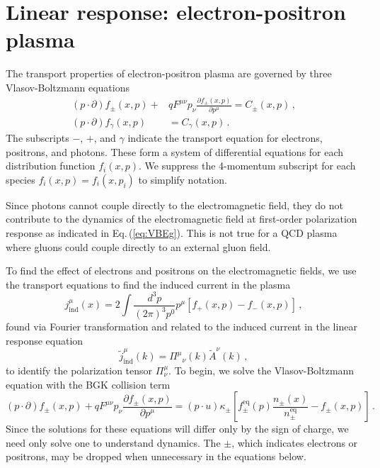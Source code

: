 \section{Linear response: electron-positron plasma}
The transport properties of electron-positron plasma are governed by three Vlasov-Boltzmann equations \cite{Grayson:2023flr}
\begin{align}\label{eq:VBEf}
(p \cdot \partial) f_\pm(x,p) + &q F^{\mu\nu} p_\nu \frac{\partial f_\pm(x,p)}{\partial p^\mu} = C_\pm(x,p)\,,\\
\label{eq:VBEg}(p \cdot \partial) f_\gamma(x,p) &= C_\gamma(x,p)\,.
\end{align}
The subscripts $-$, $+$, and $\gamma$ indicate the transport equation for electrons, positrons, and photons. These form a system of differential equations for each distribution function $f_i(x,p)$. We suppress the 4-momentum subscript for each species $f_i(x,p) = f_i(x,p_i)$ to simplify notation. 

Since photons cannot couple directly to the electromagnetic field, they do not contribute to the dynamics of the electromagnetic field at first-order polarization response as indicated in Eq.\,(\ref{eq:VBEg}). This is not true for a QCD plasma where gluons could couple directly to an external gluon field.

To find the effect of electrons and positrons on the electromagnetic fields, we use the transport equations  to find the induced current in the plasma
\begin{equation}
j_{\mathrm{ind}}^\mu(x) = 2\int \frac{d^3 p}{(2 \pi)^3 p^0}p^\mu \left[f_+(x,p)-f_-(x,p)\right]\,,
\end{equation}
found via Fourier transformation and related to the induced current in the linear response equation
\begin{equation}
    \widetilde{j}_{\mathrm{ind}}^{\mu}(k) = {\Pi^{\mu}}_{\nu}(k) \widetilde{A}^{\nu}(k)\,,
\end{equation}
to identify the polarization tensor $\Pi^{\mu}_{\nu}$. To begin, we solve the Vlasov-Boltzmann equation with the BGK collision term
\begin{equation}\label{eq:boltzmanncov}
(p \cdot \partial) f_\pm(x,p) + q F^{\mu\nu} p_\nu \frac{\partial f_\pm(x,p)}{\partial p^\mu} = (p \cdot u)\kappa_\pm\left[f^\mathrm{eq}_\pm(p)\frac{n_\pm(x)}{n^\mathrm{eq}_\pm} - f_\pm(x,p)\right]\,.
\end{equation}
Since the solutions for these equations will differ only by the sign of charge, we need only solve one to understand dynamics. The $\pm$, which indicates electrons or positrons, may be dropped when unnecessary in the equations below.

